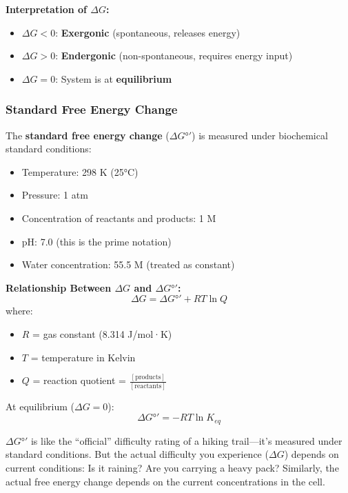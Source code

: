 \textbf{Interpretation of $\Delta G$:}
\begin{itemize}
    \item $\Delta G < 0$: \textbf{Exergonic} (spontaneous, releases energy)
    \item $\Delta G > 0$: \textbf{Endergonic} (non-spontaneous, requires energy input)
    \item $\Delta G = 0$: System is at \textbf{equilibrium}
\end{itemize}

\subsubsection{Standard Free Energy Change}

\begin{definition}
The \textbf{standard free energy change} ($\Delta G°'$) is measured under biochemical standard conditions:
\begin{itemize}
    \item Temperature: 298 K (25°C)
    \item Pressure: 1 atm
    \item Concentration of reactants and products: 1 M
    \item pH: 7.0 (this is the prime notation)
    \item Water concentration: 55.5 M (treated as constant)
\end{itemize}
\end{definition}

\begin{theorem}
\textbf{Relationship Between $\Delta G$ and $\Delta G°'$:}
\[
\Delta G = \Delta G°' + RT\ln Q
\]
where:
\begin{itemize}
    \item $R$ = gas constant (8.314 J/mol·K)
    \item $T$ = temperature in Kelvin
    \item $Q$ = reaction quotient = $\frac{[\text{products}]}{[\text{reactants}]}$
\end{itemize}

At equilibrium ($\Delta G = 0$):
\[
\Delta G°' = -RT\ln K_{eq}
\]
\end{theorem}

\begin{analogy}
$\Delta G°'$ is like the ``official'' difficulty rating of a hiking trail—it's measured under standard conditions. But the actual difficulty you experience ($\Delta G$) depends on current conditions: Is it raining? Are you carrying a heavy pack? Similarly, the actual free energy change depends on the current concentrations in the cell.
\end{analogy}


